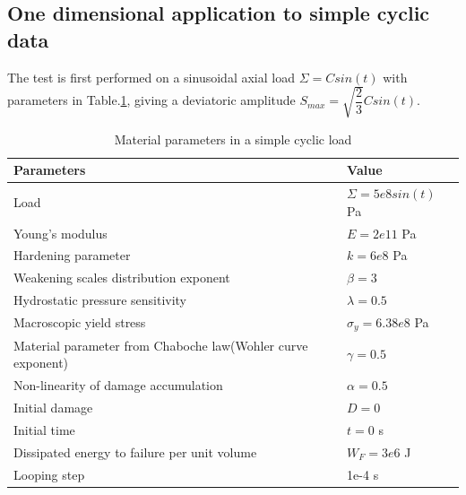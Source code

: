 \documentclass[3p,times,number,review]{elsarticle}
\begin{document}
\subsection{One dimensional application to simple cyclic data}
The test is first performed on a sinusoidal axial load $\Sigma=Csin(t)$ with parameters in Table.\ref{Sin}, giving a deviatoric amplitude $S_{max}=\sqrt{\dfrac{2}{3}}Csin(t)$.
\begin{table}[!h]
	\centering
	\begin{tabular}{ll}
		\hline
		\textbf{Parameters}                                         & \textbf{Value}                    \\ \hline
		Load                                                              & $\Sigma=5e8sin(t)$ Pa                  \\
		Young's modulus                                             & $E=2e11$ Pa                       \\
		Hardening parameter                                         &  $k=6e8$ Pa \\
		Weakening scales distribution exponent                      & $\beta=3$                             \\
		Hydrostatic pressure sensitivity                            & $\lambda=0.5$                     \\
		Macroscopic yield stress                                    & $\sigma_y=6.38e8$ Pa              \\
		Material parameter from Chaboche law(Wohler curve exponent) & $\gamma=0.5$                        \\
		Non-linearity of damage accumulation & $\alpha=0.5$                        \\
		Initial damage                                              & $D=0$                          \\
		Initial time                                                & $t=0$ s                            \\
		Dissipated energy to failure per unit volume                & $W_F=3e6$ J                       \\
		Looping step                                           & 1e-4 s              \\ \hline
	\end{tabular}
		\caption{Material parameters in a simple cyclic load }
		\label{Sin}
\end{table}
\end{document}
